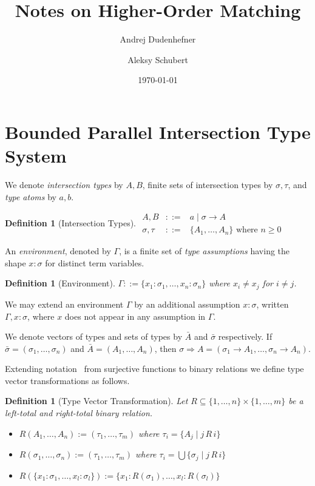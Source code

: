 \documentclass[10pt,a4paper]{article}
\title{Notes on Higher-Order Matching}
\author{Andrej Dudenhefner \and Aleksy Schubert}
\date{\today}
\theoremstyle{plain}%
\newtheorem{definition}[theorem]{Definition}
\begin{document}
\maketitle

\section{Bounded Parallel Intersection Type System}

We denote \emph{intersection types} by $A, B$, finite sets of intersection types by $\sigma, \tau$, and \emph{type atoms} by $a, b$.

\begin{definition}[Intersection Types]
\label{def:itypes}
$\begin{array}{rcl}
A, B &::=& a \mid \sigma \to A\\
\sigma, \tau &::=& \{A_1, \ldots, A_n\} \text{ where } n \geq 0
\end{array}$
\end{definition}

An \emph{environment}, denoted by $\Gamma$, is a finite set of \emph{type assumptions} having the shape $x : \sigma$ for distinct term variables.
\begin{definition}[Environment]
$\Gamma ::=\{x_1 : \sigma_1, \ldots, x_n : \sigma_n\}$ where $x_i \neq x_j$ for $i \neq j$.
\end{definition}
We may extend an environment $\Gamma$ by an additional assumption $x : \sigma$, written $\Gamma, x : \sigma$, where $x$ does not appear in any assumption in $\Gamma$.

We denote vectors of types and sets of types by $\bar{A}$ and $\bar{\sigma}$ respectively.
If $\bar{\sigma} = (\sigma_1, \ldots, \sigma_n)$ and $\bar{A} = (A_1, \ldots, A_n)$, then $\sigma \Rightarrow A = (\sigma_1 \to A_1, \ldots, \sigma_n \to A_n)$.

Extending notation~\cite{DudenhefnerU21} from surjective functions to binary relations we define type vector transformations as follows.

\begin{definition}[Type Vector Transformation]
Let $R \subseteq \{1, \ldots, n\} \times \{1, \ldots, m\}$ be a left-total and right-total binary relation.
\begin{itemize}
\item $R(A_1, \ldots, A_n) := (\tau_1, \ldots, \tau_m)$ where $\tau_i = \{A_j \mid j \, R\, i\}$
\item $R(\sigma_1, \ldots, \sigma_n) := (\tau_1, \ldots, \tau_m)$ where $\tau_i = \bigcup \{\sigma_j \mid j \, R\, i\}$
\item $R(\{x_1 : \sigma_1, \ldots, x_l : \sigma_l\}) := \{x_1 : R(\sigma_1), \ldots, x_l : R(\sigma_l)\}$
\end{itemize}
\end{definition}
\end{document}
